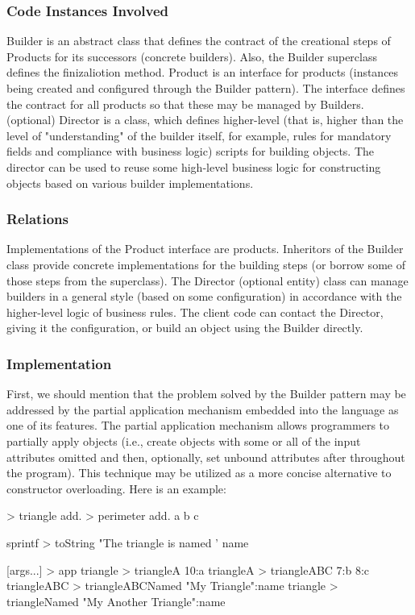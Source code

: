 \documentclass[12pt]{book}
\begin{document}
\subsubsection{Code Instances Involved}
Builder is an abstract class that defines the contract of the creational steps of Products for its successors (concrete builders). Also, the Builder superclass defines the finizaliotion method. 
Product is an interface for products (instances being created and configured through the Builder pattern). The interface defines the contract for all products so that these may be managed by Builders.
(optional) Director is a class, which defines higher-level (that is, higher than the level of "understanding" of the builder itself, for example, rules for mandatory fields and compliance with business logic) scripts for building objects. The director can be used to reuse some high-level business logic for constructing objects based on various builder implementations.

\subsubsection{Relations}
Implementations of the Product interface are products. Inheritors of the Builder class provide concrete implementations for the building steps (or borrow some of those steps from the superclass). The Director (optional entity) class can manage builders in a general style (based on some configuration) in accordance with the higher-level logic of business rules. The client code can contact the Director, giving it the configuration, or build an object using the Builder directly.

\subsubsection{Implementation}
First, we should mention that the problem solved by the Builder pattern may be addressed by the partial application mechanism embedded into the language as one of its features. The partial application mechanism allows programmers to partially apply objects (i.e., create objects with some or all of the input attributes omitted and then, optionally, set unbound attributes after throughout the program). This technique may be utilized as a more concise alternative to constructor overloading. Here is an example:
\begin{ffcode}
[a b c name] > triangle
  add. > perimeter
    add.
      a
      b
    c

  sprintf > toString
    "The triangle is named '%
    name


[args...] > app
  triangle > triangleA
    10:a
  triangleA > triangleABC
    7:b
    8:c
  triangleABC > triangleABCNamed
   "My Triangle":name
  triangle > triangleNamed
    "My Another Triangle":name

\end{ffcode}
\end{document}
